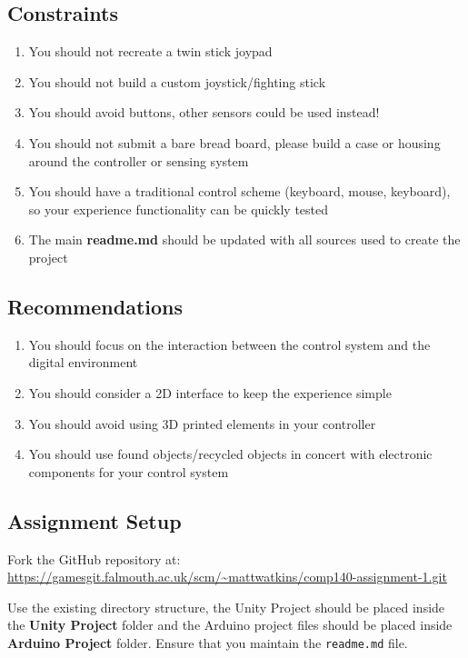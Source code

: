 \documentclass{../../fal_assignment}
\begin{document}
	\subsection*{Constraints}
	\begin{enumerate}
		\item You should not recreate a twin stick joypad
		\item You should not build a custom joystick/fighting stick
		\item You should avoid buttons, other sensors could be used instead!
		\item You should not submit a bare bread board, please build a case or housing around the controller or sensing system
		\item You should have a traditional control scheme (keyboard, mouse, keyboard), so your experience functionality can be quickly tested 
		\item The main \textbf{readme.md} should be updated with all sources used to create the project
	\end{enumerate}
	
	\subsection*{Recommendations}
	\begin{enumerate}
		\item You should focus on the interaction between the control system and the digital environment
		\item You should consider a 2D interface to keep the experience simple
		\item You should avoid using 3D printed elements in your controller
		\item You should use found objects/recycled objects in concert with electronic components for your control system
	\end{enumerate}
	
	\subsection*{Assignment Setup}
	Fork the GitHub repository at:
	\indent \url{https://gamesgit.falmouth.ac.uk/scm/~mattwatkins/comp140-assignment-1.git}
	
	Use the existing directory structure, the Unity Project should be placed inside the \textbf{Unity Project} folder and the Arduino project files should be placed inside \textbf{Arduino Project} folder. Ensure that you maintain the \texttt{readme.md} file.
	
\end{document}
